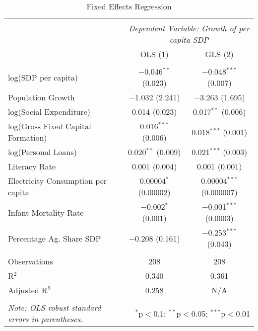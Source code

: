 \documentclass[a4paper, 11pt]{article}
\begin{document}
\begin{table}[!htbp] \centering 
  \caption{Fixed Effects Regression} 
  \label{Fixed Effects Regression} 
\begin{tabular}{@{\extracolsep{5pt}}lcc} 
\\[-1.8ex]\hline 
\hline \\[-1.8ex] 
 & \multicolumn{2}{c}{\textit{Dependent Variable: Growth of per capita SDP}} \\ 
 & OLS (1) & GLS (2) \\ 
\hline \\[-1.8ex]  
 log(SDP per capita) & $-$0.046$^{**}$ (0.023) & $-$0.048$^{***}$ (0.007) \\ 
  Population Growth & $-$1.032 (2.241) & $-$3.263 (1.695) \\ 
  log(Social Expenditure) & 0.014 (0.023) & 0.017$^{**}$ (0.006) \\ 
  log(Gross Fixed Capital Formation) & 0.016$^{***}$ (0.006) & 0.018$^{***}$ (0.001) \\ 
  log(Personal Loans) & 0.020$^{**}$ (0.009) & 0.021$^{***}$ (0.003) \\ 
  Literacy Rate & 0.001 (0.004) & 0.001 (0.001) \\ 
  Electricity Consumption per capita & 0.00004$^{*}$ (0.00002) & 0.00004$^{***}$ (0.000007) \\ 
  Infant Mortality Rate & $-$0.002$^{*}$ (0.001) & $-$0.001$^{***}$ (0.0003) \\ 
  Percentage Ag. Share SDP & $-$0.208 (0.161) & $-$0.253$^{***}$ (0.043) \\ 
 \hline \\[-1.8ex] 
Observations & 208 & 208 \\ 
R$^{2}$ & 0.340 & 0.361 \\ 
Adjusted R$^{2}$ & 0.258 & N/A \\ 
\hline 
\hline \\[-1.8ex] 
\textit{Note: OLS robust standard errors in parentheses.}  & \multicolumn{2}{r}{$^{*}$p$<$0.1; $^{**}$p$<$0.05; $^{***}$p$<$0.01} \\ 
\end{tabular} 
\end{table} 
\end{document}
